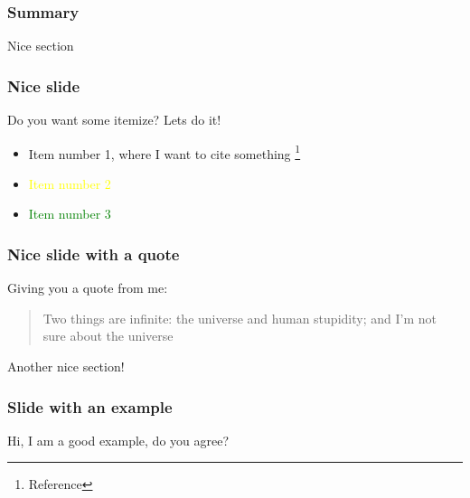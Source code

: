 \documentclass[xcolor=dvipsnames,aspectratio=169]{beamer}
\begin{document}
{



\begin{frame}[t] %
\frametitle{Summary}
\tableofcontents
\end{frame}


\begin{section}{Nice section}
\begin{frame}[t]
\frametitle{Nice slide}
Do you want some itemize? Lets do it!
\begin{itemize}
\item Item number 1, where I want to cite something \footnote{Reference}
\item  \textcolor{yellow}{Item number 2}
\item \textcolor{green}{Item number 3}
\end{itemize}
\end{frame}

\begin{frame}[t]
\frametitle{Nice slide with a quote}
Giving you a quote from me:
\begin{quote}
\textcolor{RedEurac}{Two things are infinite: the universe and human stupidity; and I'm not sure about the universe} %
\end{quote} 
\end{frame}
\end{section}

\begin{section}{Another nice section!}
\begin{frame}[t]
\frametitle{Slide with an example}
\begin{example}
Hi, I am a good example, do you agree?
\end{example}
\end{frame}


\end{section}}
\end{document}
